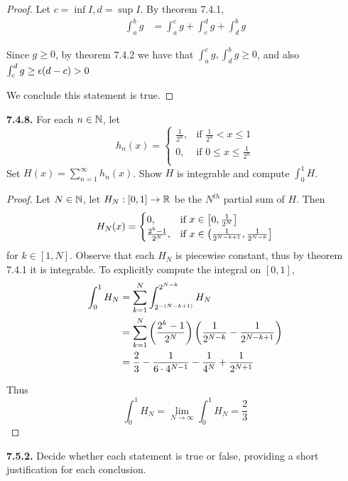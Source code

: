 \documentclass{exam}
\begin{document}
\begin{parts}
\begin{proof}
        Let $c = \inf I, d = \sup I$. By theorem 7.4.1,
        \begin{align*}
            \int_a^b g &= \int_a^c g + \int_c^d g + \int_d^b g
        \end{align*}

        Since $g \geq 0$, by theorem 7.4.2 we have that $\int_a^c g, \int_d^b g \geq 0$, and also $\int_c^d g \geq \epsilon (d - c) > 0$

        We conclude this statement is true.
    \end{proof}
\end{parts}

\newpage
\textbf{7.4.8. }
For each $n \in \mathbb {N}$, let
$$h_n(x) = \begin{cases}
    \frac{1}{2^n}, & \text{if } \frac{1}{2^n} < x \leq 1 \\
    0, & \text{if } 0 \leq x \leq \frac{1}{2^n} \\
\end{cases}$$
Set $H(x) = \sum_{n = 1}^\infty h_n(x)$. Show $H$ is integrable and compute $\int_0^1 H$.
\begin{proof}
    Let $N\in \mathbb {N}$, let $H_N: [0, 1] \rightarrow \mathbb {R}$ be the $N^{th}$ partial sum of $H$. Then
    $$H_N(x) = \begin{cases}
        0, & \text{if } x\in \left[ 0, \frac{1}{2^N} \right] \\
        \frac{2^k - 1}{2^N}, & \text{if } x\in \left (\frac{1}{2^{N - k + 1}}, \frac{1}{2^{N - k}} \right ] \\
    \end{cases}$$
    for $k \in [1, N]$. Observe that each $H_N$ is piecewise constant, thus by theorem 7.4.1 it is integrable. To explicitly compute the integral on $[0, 1]$,
    \begin{align*}
        \int_0^1 H_N &= \sum_{k = 1}^N \int_{2^{-(N - k + 1)}}^{2^{N - k}} H_N \\
        &= \sum_{k = 1}^N \left( \frac{2^k - 1}{2^N} \right)\left( \frac{1}{2^{N - k}} - \frac{1}{2^{N - k + 1}} \right) \\
        &= \frac{2}{3} - \frac{1}{6\cdot 4^{N - 1}} - \frac{1}{4^N} + \frac{1}{2^{N + 1}}
    \end{align*}

    Thus
    $$\int_0^1 H_N = \underset{N \rightarrow \infty}{\lim} \int_0^1 H_N = \frac{2}{3}$$
\end{proof}

\newpage
\textbf{7.5.2. }
Decide whether each statement is true or false, providing a short justification for each conclusion.
\end{document}
